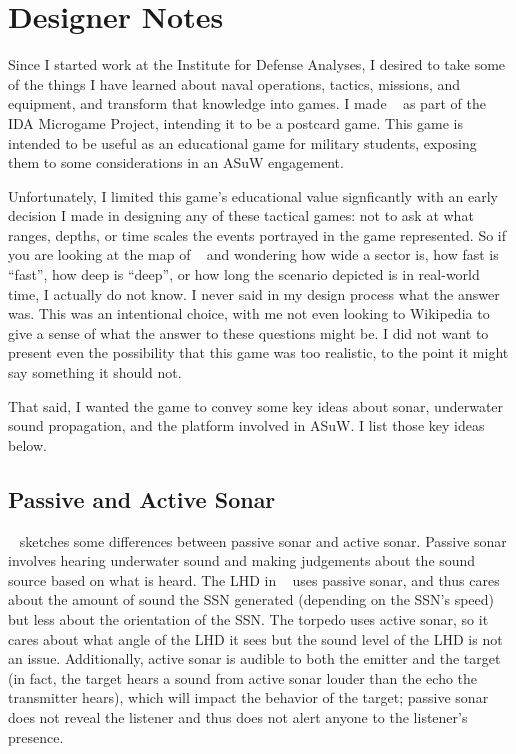 \documentclass[../TacSubGameRules.tex]{subfiles}
\begin{document}
\section*{Designer Notes}%
\label{sec:designer_notes}

Since I started work at the Institute for Defense Analyses, I desired to take some of the things I have learned about naval operations, tactics, missions, and equipment, and transform that knowledge into games.
I made \gametitle~ as part of the IDA Microgame Project, intending it to be a postcard game.
This game is intended to be useful as an educational game for military students, exposing them to some considerations in an ASuW engagement.

Unfortunately, I limited this game's educational value signficantly with an early decision I made in designing any of these tactical games: not to ask at what ranges, depths, or time scales the events portrayed in the game represented.
So if you are looking at the map of \gametitle~ and wondering how wide a sector is, how fast is ``fast'', how deep is ``deep'', or how long the scenario depicted is in real-world time, I actually do not know.
I never said in my design process what the answer was.
This was an intentional choice, with me not even looking to Wikipedia to give a sense of what the answer to these questions might be.
I did not want to present even the possibility that this game was too realistic, to the point it might say something it should not.

That said, I wanted the game to convey some key ideas about sonar, underwater sound propagation, and the platform involved in ASuW.
I list those key ideas below.

\subsection*{Passive and Active Sonar}%
\label{sub:passive_and_active_sonar}

\gametitle~ sketches some differences between passive sonar and active sonar.
Passive sonar involves hearing underwater sound and making judgements about the sound source based on what is heard.
The LHD in \gametitle~ uses passive sonar, and thus cares about the amount of sound the SSN generated (depending on the SSN's speed) but less about the orientation of the SSN.
The torpedo uses active sonar, so it cares about what angle of the LHD it sees but the sound level of the LHD is not an issue.
Additionally, active sonar is audible to both the emitter and the target (in fact, the target hears a sound from active sonar louder than the echo the transmitter hears), which will impact the behavior of the target; passive sonar does not reveal the listener and thus does not alert anyone to the listener's presence.
\end{document}
